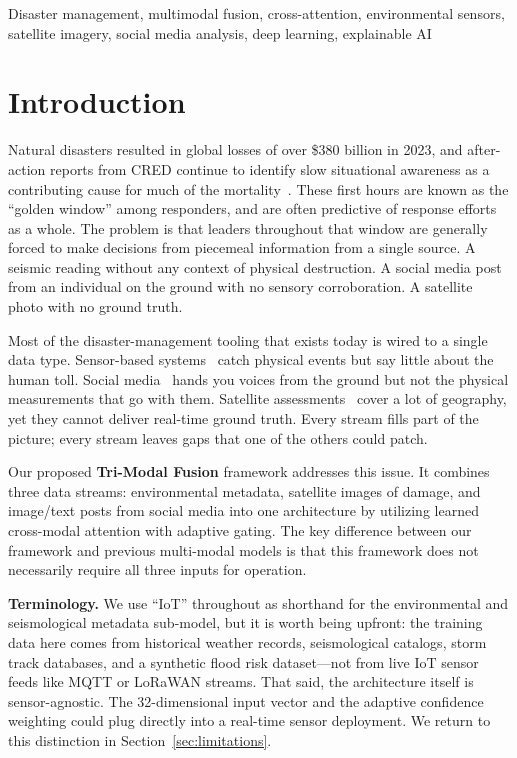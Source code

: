 \documentclass[journal]{IEEEtran}
\begin{document}
\begin{IEEEkeywords}
Disaster management, multimodal fusion, cross-attention, environmental sensors, satellite imagery, social media analysis, deep learning, explainable AI
\end{IEEEkeywords}

\section{Introduction}

Natural disasters resulted in global losses of over \$380 billion in 2023, and after-action reports from CRED continue to identify slow situational awareness as a contributing cause for much of the mortality~\cite{cred2023}. These first hours are known as the ``golden window'' among responders, and are often predictive of response efforts as a whole. The problem is that leaders throughout that window are generally forced to make decisions from piecemeal information from a single source. A seismic reading without any context of physical destruction. A social media post from an individual on the ground with no sensory corroboration. A satellite photo with no ground truth. 

Most of the disaster-management tooling that exists today is wired to a single data type. Sensor-based systems~\cite{sakaki2010earthquake} catch physical events but say little about the human toll. Social media~\cite{alam2018crisismmd,imran2015processing} hands you voices from the ground but not the physical measurements that go with them. Satellite assessments~\cite{gupta2019xbd} cover a lot of geography, yet they cannot deliver real-time ground truth. Every stream fills part of the picture; every stream leaves gaps that one of the others could patch.

Our proposed \textbf{Tri-Modal Fusion} framework addresses this issue. It combines three data streams: environmental metadata, satellite images of damage, and image/text posts from social media into one architecture by utilizing learned cross-modal attention with adaptive gating. The key difference between our framework and previous multi-modal models is that this framework does not necessarily require all three inputs for operation.

\textbf{Terminology.} We use ``IoT'' throughout as shorthand for the environmental and seismological metadata sub-model, but it is worth being upfront: the training data here comes from historical weather records, seismological catalogs, storm track databases, and a synthetic flood risk dataset---not from live IoT sensor feeds like MQTT or LoRaWAN streams. That said, the architecture itself is sensor-agnostic. The 32-dimensional input vector and the adaptive confidence weighting could plug directly into a real-time sensor deployment. We return to this distinction in Section~\ref{sec:limitations}.
\end{document}
